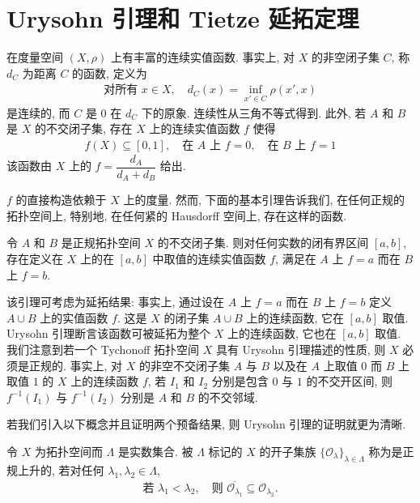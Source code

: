\documentclass[../../main.tex]{subfiles}
\begin{document}
\section{Urysohn 引理和 Tietze 延拓定理}\label{section:ch12-Urysohn-Tietze}

在度量空间 $(X,\rho)$ 上有丰富的连续实值函数. 事实上, 对 $X$ 的非空闭子集 $C$, 称 $d_{C}$ 为距离 $C$ 的函数, 定义为
\begin{align*}
\text{对所有 }x\in X,\quad d_{C}(x)=\inf_{x'\in C}\rho(x',x)
\end{align*}
是连续的, 而 $C$ 是 $0$ 在 $d_{C}$ 下的原象. 连续性从三角不等式得到. 此外, 若 $A$ 和 $B$ 是 $X$ 的不交闭子集, 存在 $X$ 上的连续实值函数 $f$ 使得
\begin{align*}
f(X)\subseteq[0,1],\quad\text{在 }A\text{ 上 }f=0,\quad\text{在 }B\text{ 上 }f=1
\end{align*}
该函数由 $X$ 上的 $f=\dfrac{d_{A}}{d_{A}+d_{B}}$ 给出.

$f$ 的直接构造依赖于 $X$ 上的度量. 然而, 下面的基本引理告诉我们, 在任何正规的拓扑空间上, 特别地, 在任何紧的 Hausdorff 空间上, 存在这样的函数.

\begin{theorem}[Urysohn 引理]\label{theorem:ch12-Urysohn}
令 $A$ 和 $B$ 是正规拓扑空间 $X$ 的不交闭子集. 则对任何实数的闭有界区间 $[a,b]$, 存在定义在 $X$ 上的在 $[a,b]$ 中取值的连续实值函数 $f$, 满足在 $A$ 上 $f=a$ 而在 $B$ 上 $f=b$.
\end{theorem}

该引理可考虑为延拓结果: 事实上, 通过设在 $A$ 上 $f=a$ 而在 $B$ 上 $f=b$ 定义 $A\cup B$ 上的实值函数 $f$. 这是 $X$ 的闭子集 $A\cup B$ 上的连续函数, 它在 $[a,b]$ 取值. Urysohn 引理断言该函数可被延拓为整个 $X$ 上的连续函数, 它也在 $[a,b]$ 取值. 我们注意到若一个 Tychonoff 拓扑空间 $X$ 具有 Urysohn 引理描述的性质, 则 $X$ 必须是正规的. 事实上, 对 $X$ 的非空不交闭子集 $A$ 与 $B$ 以及在 $A$ 上取值 $0$ 而 $B$ 上取值 $1$ 的 $X$ 上的连续函数 $f$, 若 $I_{1}$ 和 $I_{2}$ 分别是包含 $0$ 与 $1$ 的不交开区间, 则 $f^{-1}(I_{1})$ 与 $f^{-1}(I_{2})$ 分别是 $A$ 和 $B$ 的不交邻域.

若我们引入以下概念并且证明两个预备结果, 则 Urysohn 引理的证明就更为清晰.

\begin{definition}[正规上升族]\label{definition:ch12-正规上升}
令 $X$ 为拓扑空间而 $\Lambda$ 是实数集合. 被 $\Lambda$ 标记的 $X$ 的开子集族 $\{\mathcal{O}_{\lambda}\}_{\lambda\in\Lambda}$ 称为是正规上升的, 若对任何 $\lambda_{1},\lambda_{2}\in\Lambda$,
\begin{align*}
\text{若 }\lambda_{1}<\lambda_{2},\quad\text{则 }\overline{\mathcal{O}_{\lambda_{1}}}\subseteq\mathcal{O}_{\lambda_{2}}.
\end{align*}
\end{definition}
\end{document}
